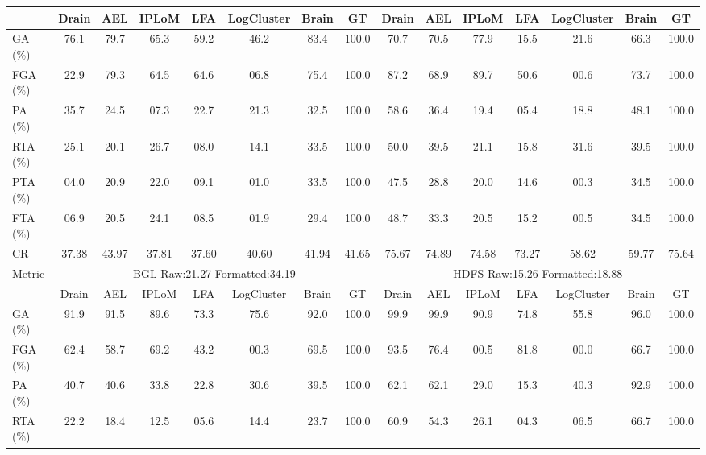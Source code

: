 \begin{table}[p]
\begin{adjustbox}{width=\textwidth,max totalheight=.86\textheight}
\begin{tabular}{l|ccccccc|ccccccc}
\cmidrule(lr){2-8} \cmidrule(lr){9-15}
& Drain & AEL & IPLoM & LFA & LogCluster & Brain & GT & Drain & AEL & IPLoM & LFA & LogCluster & Brain & GT \\
\midrule
GA (\%) & 76.1 & 79.7 & 65.3 & 59.2 & 46.2 & 83.4 & \cellcolor{lightgray}100.0 & 70.7 & 70.5 & 77.9 & 15.5 & 21.6 & 66.3 & \cellcolor{lightgray}100.0 \\
FGA (\%) & 22.9 & 79.3 & 64.5 & 64.6 & 06.8 & 75.4 & \cellcolor{lightgray}100.0 & 87.2 & 68.9 & 89.7 & 50.6 & 00.6 & 73.7 & \cellcolor{lightgray}100.0 \\
PA (\%) & 35.7 & 24.5 & 07.3 & 22.7 & 21.3 & 32.5 & \cellcolor{lightgray}100.0 & 58.6 & 36.4 & 19.4 & 05.4 & 18.8 & 48.1 & \cellcolor{lightgray}100.0 \\
RTA (\%) & 25.1 & 20.1 & 26.7 & 08.0 & 14.1 & 33.5 & \cellcolor{lightgray}100.0 & 50.0 & 39.5 & 21.1 & 15.8 & 31.6 & 39.5 & \cellcolor{lightgray}100.0 \\
PTA (\%) & 04.0 & 20.9 & 22.0 & 09.1 & 01.0 & 33.5 & \cellcolor{lightgray}100.0 & 47.5 & 28.8 & 20.0 & 14.6 & 00.3 & 34.5 & \cellcolor{lightgray}100.0 \\
FTA (\%) & 06.9 & 20.5 & 24.1 & 08.5 & 01.9 & 29.4 & \cellcolor{lightgray}100.0 & 48.7 & 33.3 & 20.5 & 15.2 & 00.5 & 34.5 & \cellcolor{lightgray}100.0 \\
CR & \underline{37.38} & \cellcolor{lightgray}43.97 & 37.81 & 37.60 & 40.60 & 41.94 & 41.65 & \cellcolor{lightgray}75.67 & 74.89 & 74.58 & 73.27 & \underline{58.62} & 59.77 & 75.64 \\
\midrule
\multirow{2}{*}{Metric} & \multicolumn{7}{c}{BGL Raw:21.27 Formatted:34.19} & \multicolumn{7}{c}{HDFS Raw:15.26 Formatted:18.88} \\
\cmidrule(lr){2-8} \cmidrule(lr){9-15}
& Drain & AEL & IPLoM & LFA & LogCluster & Brain & GT & Drain & AEL & IPLoM & LFA & LogCluster & Brain & GT \\
\midrule
GA (\%) & 91.9 & 91.5 & 89.6 & 73.3 & 75.6 & 92.0 & \cellcolor{lightgray}100.0 & 99.9 & 99.9 & 90.9 & 74.8 & 55.8 & 96.0 & \cellcolor{lightgray}100.0 \\
FGA (\%) & 62.4 & 58.7 & 69.2 & 43.2 & 00.3 & 69.5 & \cellcolor{lightgray}100.0 & 93.5 & 76.4 & 00.5 & 81.8 & 00.0 & 66.7 & \cellcolor{lightgray}100.0 \\
PA (\%) & 40.7 & 40.6 & 33.8 & 22.8 & 30.6 & 39.5 & \cellcolor{lightgray}100.0 & 62.1 & 62.1 & 29.0 & 15.3 & 40.3 & 92.9 & \cellcolor{lightgray}100.0 \\
RTA (\%) & 22.2 & 18.4 & 12.5 & 05.6 & 14.4 & 23.7 & \cellcolor{lightgray}100.0 & 60.9 & 54.3 & 26.1 & 04.3 & 06.5 & 66.7 & \cellcolor{lightgray}100.0 \\

\end{tabular}
\end{adjustbox}
\end{table}
